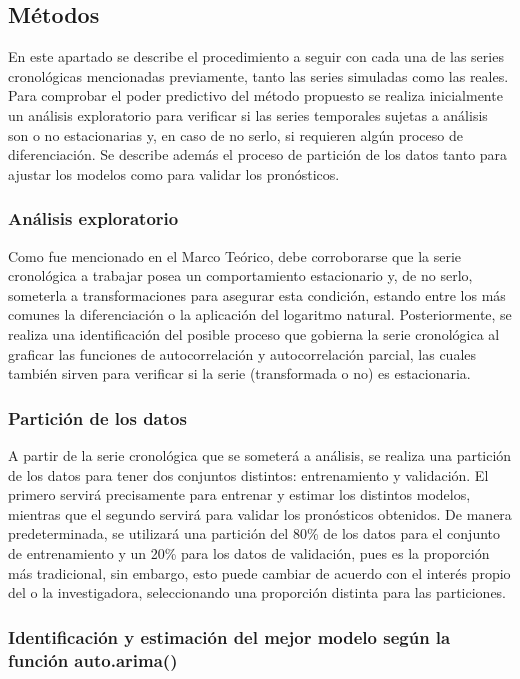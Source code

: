 \documentclass[
]{article}
\begin{document}
\subsection{Métodos}

En este apartado se describe el procedimiento a seguir con cada una de
las series cronológicas mencionadas previamente, tanto las series
simuladas como las reales. Para comprobar el poder predictivo del método
propuesto se realiza inicialmente un análisis exploratorio para
verificar si las series temporales sujetas a análisis son o no
estacionarias y, en caso de no serlo, si requieren algún proceso de
diferenciación. Se describe además el proceso de partición de los datos
tanto para ajustar los modelos como para validar los pronósticos.

\subsubsection{Análisis exploratorio}

Como fue mencionado en el Marco Teórico, debe corroborarse que la serie
cronológica a trabajar posea un comportamiento estacionario y, de no
serlo, someterla a transformaciones para asegurar esta condición,
estando entre los más comunes la diferenciación o la aplicación del
logaritmo natural. Posteriormente, se realiza una identificación del
posible proceso que gobierna la serie cronológica al graficar las
funciones de autocorrelación y autocorrelación parcial, las cuales
también sirven para verificar si la serie (transformada o no) es
estacionaria.

\subsubsection{Partición de los datos}

A partir de la serie cronológica que se someterá a análisis, se realiza
una partición de los datos para tener dos conjuntos distintos:
entrenamiento y validación. El primero servirá precisamente para
entrenar y estimar los distintos modelos, mientras que el segundo
servirá para validar los pronósticos obtenidos. De manera
predeterminada, se utilizará una partición del 80\% de los datos para el
conjunto de entrenamiento y un 20\% para los datos de validación, pues
es la proporción más tradicional, sin embargo, esto puede cambiar de
acuerdo con el interés propio del o la investigadora, seleccionando una
proporción distinta para las particiones.

\subsubsection{Identificación y estimación del mejor modelo según la función auto.arima()}
\end{document}
